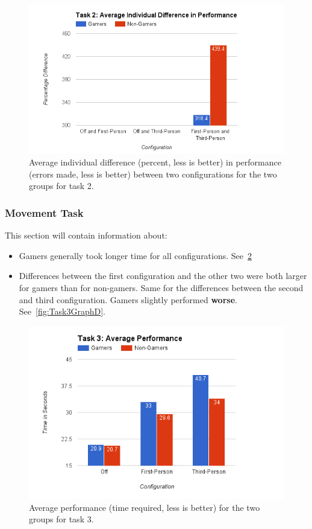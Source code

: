\documentclass[runningheads,a4paper,oribibl]{llncs}
\begin{document}
\begin{figure}
   \centering
   \includegraphics[width=\textwidth]{ExternalMaterial/Task2GraphD}
   \caption{Average individual difference (percent, less is better) in performance (errors made, less is better) between two configurations for the two groups for task 2.} \label{fig:Task2GraphD}
\end{figure}





\subsubsection{Movement Task}
This section will contain information about:
\begin{itemize}
	\item Gamers generally took longer time for all configurations. See~\ref{fig:Task3GraphP}
	\item Differences between the first configuration and the other two were both larger for gamers than for non-gamers. Same for the differences between the second and third configuration. Gamers slightly performed \textbf{worse}. See~\ref{fig:Task3GraphD}.
\end{itemize}

\begin{figure}
   \centering
   \includegraphics[width=\textwidth]{ExternalMaterial/Task3GraphP}
   \caption{Average performance (time required, less is better) for the two groups for task 3.} \label{fig:Task3GraphP}
\end{figure}
\end{document}
